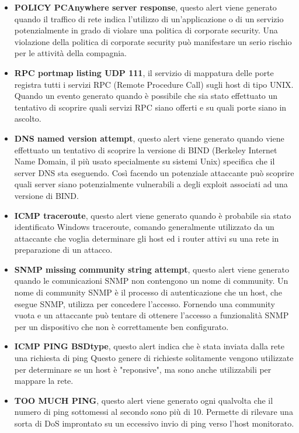 \begin{itemize}
    \item \textbf{POLICY PCAnywhere server response}, questo alert viene generato quando il traffico di rete indica l'utilizzo di un'applicazione o di un servizio potenzialmente in grado di violare una politica di corporate security. Una violazione della politica di corporate security può manifestare un serio rischio per le attività della compagnia.
        
    \item \textbf{RPC portmap listing UDP 111}, il servizio di mappatura delle porte registra tutti i servizi RPC (Remote Procedure Call) sugli host di tipo UNIX. Quando un evento generato quando è possibile che sia stato effettuato un tentativo di scoprire quali servizi RPC siano offerti e su quali porte siano in ascolto.
        
    \item \textbf{DNS named version attempt}, questo alert viene generato quando viene effettuato un tentativo di scoprire la versione di BIND (Berkeley Internet Name Domain, il più usato specialmente su sistemi Unix) specifica che il server DNS sta eseguendo. Così facendo un potenziale attaccante può scoprire quali server siano potenzialmente vulnerabili a degli exploit associati ad una versione di BIND.
        
    \item \textbf{ICMP traceroute}, questo alert viene generato quando è probabile sia stato identificato Windows traceroute, comando generalmente utilizzato da un attaccante che voglia determinare gli host ed i router attivi su una rete in preparazione di un attacco.
        
    \item \textbf{SNMP missing community string attempt}, questo alert viene generato quando le comunicazioni SNMP non contengono un nome di community. Un nome di community SNMP è il processo di autenticazione che un host, che esegue SNMP, utilizza per concedere l'accesso. Fornendo una community vuota e un attaccante può tentare di ottenere l'accesso a funzionalità SNMP per un dispositivo che non è correttamente ben configurato.
        
    \item \textbf{ICMP PING BSDtype}, questo alert indica che è stata inviata dalla rete una richiesta di ping Questo genere di richieste solitamente vengono utilizzate per determinare se un host è "reponsive", ma sono anche  utilizzabili per mappare la rete.
    
    \item \textbf{TOO MUCH PING}, questo alert viene generato ogni qualvolta che il numero di ping sottomessi al secondo sono più di 10. Permette di rilevare una sorta di DoS improntato su un eccessivo invio di ping verso l'host monitorato.
    

\end{itemize}
